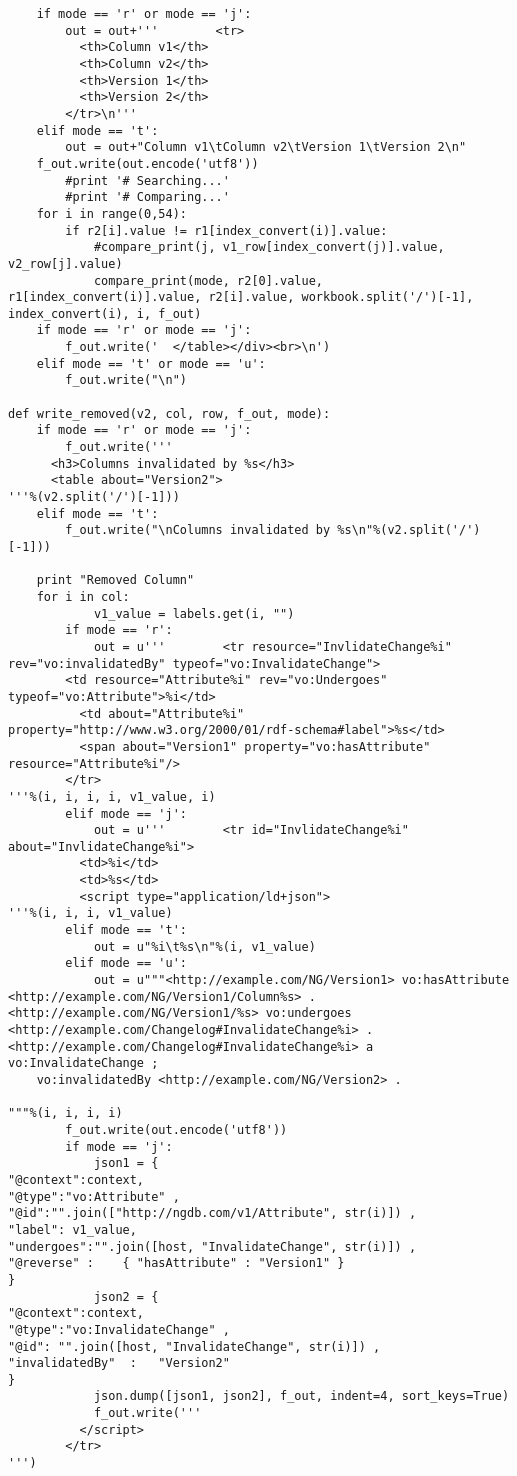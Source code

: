 \begin{verbatim}
	if mode == 'r' or mode == 'j':
		out = out+'''        <tr>
          <th>Column v1</th>
          <th>Column v2</th>
          <th>Version 1</th>
          <th>Version 2</th>
        </tr>\n'''
	elif mode == 't':
		out = out+"Column v1\tColumn v2\tVersion 1\tVersion 2\n"
	f_out.write(out.encode('utf8'))
		#print '# Searching...'
		#print '# Comparing...'
	for i in range(0,54):
		if r2[i].value != r1[index_convert(i)].value:
			#compare_print(j, v1_row[index_convert(j)].value, v2_row[j].value)
			compare_print(mode, r2[0].value, r1[index_convert(i)].value, r2[i].value, workbook.split('/')[-1], index_convert(i), i, f_out)
	if mode == 'r' or mode == 'j':
		f_out.write('  </table></div><br>\n')
	elif mode == 't' or mode == 'u':
		f_out.write("\n")

def write_removed(v2, col, row, f_out, mode):
	if mode == 'r' or mode == 'j':
		f_out.write('''
      <h3>Columns invalidated by %s</h3>
      <table about="Version2">
'''%(v2.split('/')[-1]))
	elif mode == 't':
		f_out.write("\nColumns invalidated by %s\n"%(v2.split('/')[-1]))

	print "Removed Column"
	for i in col:
        	v1_value = labels.get(i, "")
		if mode == 'r':
			out = u'''        <tr resource="InvlidateChange%i" rev="vo:invalidatedBy" typeof="vo:InvalidateChange">
		<td resource="Attribute%i" rev="vo:Undergoes" typeof="vo:Attribute">%i</td>
          <td about="Attribute%i" property="http://www.w3.org/2000/01/rdf-schema#label">%s</td>
          <span about="Version1" property="vo:hasAttribute" resource="Attribute%i"/>
        </tr>
'''%(i, i, i, i, v1_value, i)
		elif mode == 'j':
			out = u'''        <tr id="InvlidateChange%i" about="InvlidateChange%i">
          <td>%i</td>
          <td>%s</td>
          <script type="application/ld+json">
'''%(i, i, i, v1_value)
		elif mode == 't':
			out = u"%i\t%s\n"%(i, v1_value)
		elif mode == 'u':
			out = u"""<http://example.com/NG/Version1> vo:hasAttribute <http://example.com/NG/Version1/Column%s> .
<http://example.com/NG/Version1/%s> vo:undergoes <http://example.com/Changelog#InvalidateChange%i> .
<http://example.com/Changelog#InvalidateChange%i> a vo:InvalidateChange ;
	vo:invalidatedBy <http://example.com/NG/Version2> .

"""%(i, i, i, i)
		f_out.write(out.encode('utf8'))
		if mode == 'j':
			json1 = {
"@context":context,
"@type":"vo:Attribute" ,
"@id":"".join(["http://ngdb.com/v1/Attribute", str(i)]) ,
"label": v1_value,
"undergoes":"".join([host, "InvalidateChange", str(i)]) ,
"@reverse" :    { "hasAttribute" : "Version1" }
}
			json2 = {
"@context":context,
"@type":"vo:InvalidateChange" ,
"@id": "".join([host, "InvalidateChange", str(i)]) ,
"invalidatedBy"  :   "Version2"
}
			json.dump([json1, json2], f_out, indent=4, sort_keys=True)
			f_out.write('''
          </script>
        </tr>
''')
			


\end{verbatim}

